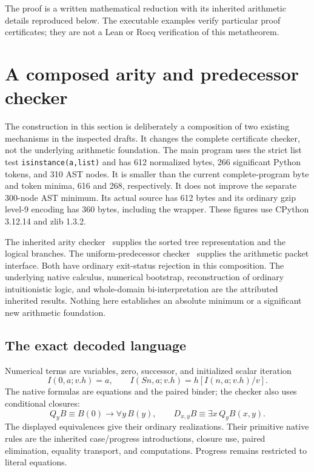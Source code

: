 \documentclass[11pt,letterpaper]{article}
\theoremstyle{definition}\newtheorem{definition}[theorem]{Definition}
\theoremstyle{remark}\newtheorem{remark}[theorem]{Remark}
\begin{document}
The proof is a written mathematical reduction with its inherited
arithmetic details reproduced below. The executable examples verify
particular proof certificates; they are not a Lean or Rocq verification
of this metatheorem.



\section{A composed arity and predecessor checker}
\label{sec:composed-checker}
\label{sec:composition}

The construction in this section is deliberately a composition of two
existing mechanisms in the inspected drafts.  It changes the complete
certificate checker, not the underlying arithmetic foundation.  The main
program uses the strict list test \texttt{isinstance(a,list)} and has
612 normalized bytes, 266 significant Python tokens, and 310 AST nodes.
It is smaller than the current complete-program byte and token minima,
616 and 268, respectively.  It does not improve the separate 300-node
AST minimum.  Its actual source has 612 bytes and its ordinary gzip
level-9 encoding has 360 bytes, including the wrapper.  These figures
use CPython 3.12.14 and zlib 1.3.2.

The inherited arity checker~\cite{arity} supplies the sorted tree representation and
the logical branches.  The uniform-predecessor checker~\cite{uniform} supplies the
arithmetic packet interface.  Both have ordinary exit-status rejection
in this composition.  The underlying native calculus, numerical
bootstrap, reconstruction of ordinary intuitionistic logic, and
whole-domain bi-interpretation are the attributed inherited results.
Nothing here establishes an absolute minimum or a significant new
arithmetic foundation.

\subsection{The exact decoded language}

Numerical terms are variables, zero, successor, and initialized scalar
iteration
\[
 I(0,a;v.h)=a,\qquad
 I(Sn,a;v.h)=h[I(n,a;v.h)/v].
\]
The native formulas are equations and the paired binder; the checker
also uses conditional closures:
\[
 Q_y B\equiv B(0)\to\forall y\,B(y),\qquad
 D_{x,y}B\equiv\exists x\,Q_yB(x,y).
\]
The displayed equivalences give their ordinary realizations.  Their
primitive native rules are the inherited case/progress introductions,
closure use, paired elimination, equality transport, and computations.
Progress remains restricted to literal equations.
\end{document}
